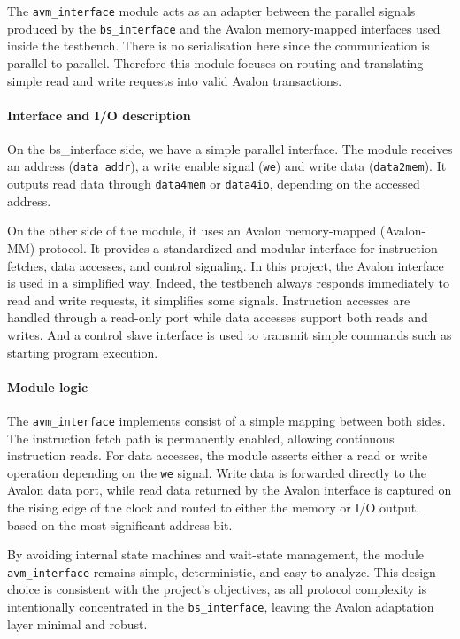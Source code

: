 \documentclass[12pt]{article}
\begin{document}
The \texttt{avm\_interface} module acts as an adapter between the parallel signals produced by the \texttt{bs\_interface} and the Avalon memory-mapped interfaces used inside the testbench. There is no serialisation here since the communication is parallel to parallel. Therefore this module focuses on routing and translating simple read and write requests into valid Avalon transactions.

\paragraph{Interface and I/O description}

On the bs\_interface side, we have a simple parallel interface. The module receives an address (\texttt{data\_addr}), a write enable signal (\texttt{we}) and write data (\texttt{data2mem}). It outputs read data through \texttt{data4mem} or \texttt{data4io}, depending on the accessed address. 

On the other side of the module, it uses an Avalon memory-mapped (Avalon-MM) protocol. It provides a standardized and modular interface for instruction fetches, data accesses, and control signaling. In this project, the Avalon interface is used in a simplified way. Indeed, the testbench always responds immediately to read and write requests, it simplifies some signals. Instruction accesses are handled through a read-only port while data accesses support both reads and writes. And a control slave interface is used to transmit simple commands such as starting program execution.

\paragraph{Module logic}

The \texttt{avm\_interface} implements consist of a simple mapping between both sides. The instruction fetch path is permanently enabled, allowing continuous instruction reads. For data accesses, the module asserts either a read or write operation depending on the \texttt{we} signal. Write data is forwarded directly to the Avalon data port, while read data returned by the Avalon interface is captured on the rising edge of the clock and routed to either the memory or I/O output, based on the most significant address bit.

By avoiding internal state machines and wait-state management, the module \texttt{avm\_interface} remains simple, deterministic, and easy to analyze. This design choice is consistent with the project’s objectives, as all protocol complexity is intentionally concentrated in the \texttt{bs\_interface}, leaving the Avalon adaptation layer minimal and robust.
\end{document}
